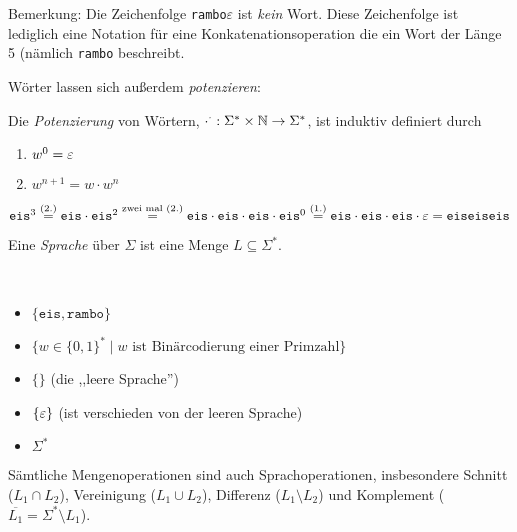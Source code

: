 Bemerkung: Die Zeichenfolge \texttt{rambo}$\varepsilon$ ist \emph{kein} Wort.
Diese Zeichenfolge ist lediglich eine Notation für eine Konkatenationsoperation die ein Wort der Länge 5 (nämlich \texttt{rambo} beschreibt.

Wörter lassen sich außerdem \emph{potenzieren}:
\begin{Def}
  Die \emph{Potenzierung} von Wörtern, $\cdot ^ \cdot: \Sigma^*\times \mathbb{N} \to \Sigma^*$, ist induktiv definiert durch
  \begin{enumerate}
  \item $w^0 = \varepsilon$ 
  \item $w^{n+1} = w \cdot w^n$
  \end{enumerate}
\end{Def}
\begin{Bsp*} $\mathtt{eis}^3 
\stackrel{(2.)}{=} \mathtt{eis}\cdot\mathtt{eis}^2 
\stackrel{\text{zwei mal } (2.)}{=} \mathtt{eis}\cdot\mathtt{eis}\cdot\mathtt{eis}\cdot\mathtt{eis}^0
\stackrel{(1.)}{=} \mathtt{eis}\cdot\mathtt{eis}\cdot\mathtt{eis}\cdot\varepsilon
= \mathtt{eiseiseis}
$
\end{Bsp*}

\begin{Def}[name={[Sprache über $\Sigma$]}]
	Eine \emph{Sprache} über $\Sigma$ ist eine Menge $L\subseteq\Sigma^*$.
\end{Def}

\goodbreak

\begin{Bsp*}~ 
  \begin{itemize}
  \item 
	$\{\mathtt{eis}, \mathtt{rambo}\}$
  \item
    $\{w\in\{0,1\}^*\mid w \text{ ist Bin\"arcodierung einer Primzahl}\}$
  \item $\{\}$ (die ,,leere Sprache'')
  \item $\{ \varepsilon \}$ (ist verschieden von der leeren Sprache)
  \item $\Sigma^*$
  \end{itemize}
\end{Bsp*}
Sämtliche Mengenoperationen sind auch Sprachoperationen, insbesondere Schnitt ($L_1 \cap L_2$), Vereinigung ($L_1 \cup L_2$), Differenz ($L_1 \setminus L_2$) und Komplement ($\overline{L_1} = \Sigma^* \setminus L_1$).

